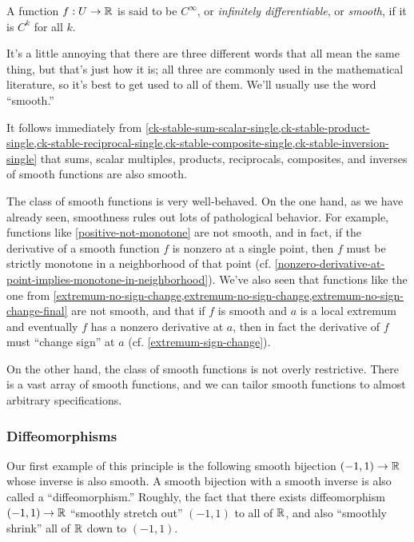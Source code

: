 \begin{definition}   
	A function $f : U \to \mathbb{R}$ is said to be $C^\infty$, or \emph{infinitely differentiable}, or \emph{smooth}, if it is $C^k$ for all $k$. 
\end{definition}

It's a little annoying that there are three different words that all mean the same thing, but that's just how it is; all three are commonly used in the mathematical literature, so it's best to get used to all of them. We'll usually use the word ``smooth.'' 

It follows immediately from \cref{ck-stable-sum-scalar-single,ck-stable-product-single,ck-stable-reciprocal-single,ck-stable-composite-single,ck-stable-inversion-single} that sums, scalar multiples, products, reciprocals, composites, and inverses of smooth functions are also smooth. 

The class of smooth functions is very well-behaved. On the one hand, as we have already seen, smoothness rules out lots of pathological behavior. For example, functions like \cref{positive-not-monotone} are not smooth, and in fact, if the derivative of a smooth function $f$ is nonzero at a single point, then $f$ must be strictly monotone in a neighborhood of that point (cf. \cref{nonzero-derivative-at-point-implies-monotone-in-neighborhood}). We've also seen that functions like the one from \cref{extremum-no-sign-change,extremum-no-sign-change,extremum-no-sign-change-final} are not smooth, and that if $f$ is smooth and $a$ is a local extremum and eventually $f$ has a nonzero derivative at $a$, then in fact the derivative of $f$ must ``change sign'' at $a$ (cf. \cref{extremum-sign-change}). 

On the other hand, the class of smooth functions is not overly restrictive. There is a vast array of smooth functions, and we can tailor smooth functions to almost arbitrary specifications. 

\subsubsection*{Diffeomorphisms}

Our first example of this principle is the following smooth bijection $(-1,1) \to \mathbb{R}$ whose inverse is also smooth. A smooth bijection with a smooth inverse is also called a ``diffeomorphism.'' Roughly, the fact that there exists diffeomorphism $(-1,1) \to \mathbb{R}$ ``smoothly stretch out'' $(-1,1)$ to all of $\mathbb{R}$, and also ``smoothly shrink'' all of $\mathbb{R}$ down to $(-1,1)$. 


